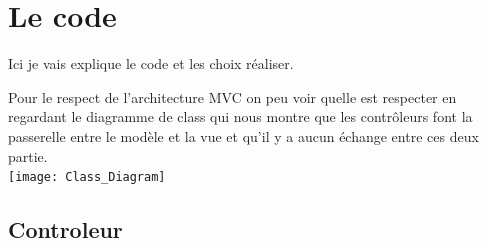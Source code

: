\documentclass{article}
\begin{document}
\clearpage
\section{Le code}
    Ici je vais explique le code et les choix réaliser.
    
    Pour le respect de l'architecture MVC on peu voir quelle est respecter en regardant le diagramme de class qui nous montre que les contrôleurs font la passerelle entre le modèle et la vue et qu'il y a aucun échange entre ces deux partie.\\
    \texttt{[image: Class\_Diagram]}\\
    
    
    \subsection{Controleur}
    
\end{document}
